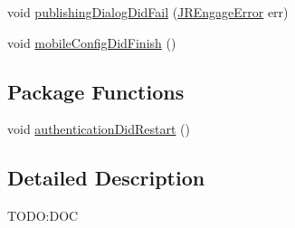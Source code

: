 \begin{DoxyCompactItemize}
\item 
void \hyperlink{interfacecom_1_1janrain_1_1android_1_1engage_1_1session_1_1_j_r_session_delegate_a5c44554bcf526069501cab3b68d292a4}{publishingDialogDidFail} (\hyperlink{classcom_1_1janrain_1_1android_1_1engage_1_1_j_r_engage_error}{JREngageError} err)
\item 
void \hyperlink{interfacecom_1_1janrain_1_1android_1_1engage_1_1session_1_1_j_r_session_delegate_af524fe71d1429f96db43a033a56b2d7a}{mobileConfigDidFinish} ()
\end{DoxyCompactItemize}
\subsection*{Package Functions}
\begin{DoxyCompactItemize}
\item 
void \hyperlink{interfacecom_1_1janrain_1_1android_1_1engage_1_1session_1_1_j_r_session_delegate_a37be024d8fe6d9ee564a52a1c5c0db1a}{authenticationDidRestart} ()
\end{DoxyCompactItemize}


\subsection{Detailed Description}
TODO:DOC 

